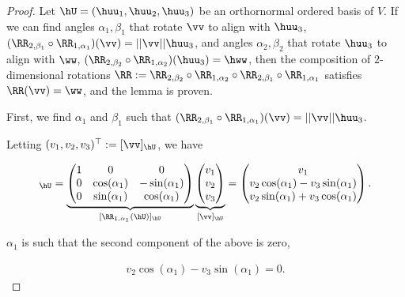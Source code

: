 \begin{proof}
    Let $\hU = (\huu_1, \huu_2, \huu_3)$ be an orthornormal ordered basis of $V$. If we can find angles $\alpha_1, \beta_1$ that rotate $\vv$ to align with $\huu_3$, $(\RR_{2, \beta_1} \circ \RR_{1, \alpha_1})(\vv) = ||\vv||\huu_3$, and angles $\alpha_2, \beta_2$ that rotate $\huu_3$ to align with $\ww$, $(\RR_{2, \beta_2} \circ \RR_{1, \alpha_2})(\huu_3) = \hww$, then the composition of $2$-dimensional rotations $\RR := \RR_{2, \beta_2} \circ \RR_{1, \alpha_2} \circ \RR_{2, \beta_1} \circ \RR_{1, \alpha_1}$ satisfies $\RR(\vv) = \ww$, and the lemma is proven.

    \vspace{.5cm}

    First, we find $\alpha_1$ and $\beta_1$ such that $(\RR_{2, \beta_1} \circ \RR_{1, \alpha_1})(\vv) = ||\vv||\huu_3$.

    Letting $(v_1, v_2, v_3)^\top := [\vv]_{\hU}$, we have
    
    \begin{align*}
        [\RR_{1, \alpha_1}(\vv)]_{\hU} =
        \underbrace
        {
            \begin{pmatrix}
                1 & 0 & 0 \\
                0 & \cos(\alpha_1) & -\sin(\alpha_1) \\
                0 & \sin(\alpha_1) & \cos(\alpha_1)
            \end{pmatrix}
        }_{[\RR_{1, \alpha_1}(\hU)]_{\hU}}
        \underbrace
        {
            \begin{pmatrix}
                v_1 \\ v_2 \\ v_3
            \end{pmatrix}
        }_{[\vv]_{\hU}}
        =
        \begin{pmatrix}
            v_1 \\
            v_2 \cos(\alpha_1) - v_3 \sin(\alpha_1) \\
            v_2 \sin(\alpha_1) + v_3 \cos(\alpha_1)
        \end{pmatrix}.
    \end{align*}

    $\alpha_1$ is such that the second component of the above is zero,

    \begin{align*}
        v_2 \cos(\alpha_1) - v_3 \sin(\alpha_1) = 0.
    \end{align*}
    

\end{proof}
